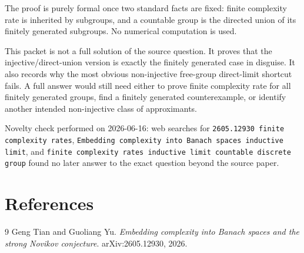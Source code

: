 \documentclass[11pt]{article}
\begin{document}
The proof is purely formal once two standard facts are fixed: finite complexity rate is inherited by subgroups, and a countable group is the directed union of its finitely generated subgroups. No numerical computation is used.

This packet is not a full solution of the source question. It proves that the injective/direct-union version is exactly the finitely generated case in disguise. It also records why the most obvious non-injective free-group direct-limit shortcut fails. A full answer would still need either to prove finite complexity rate for all finitely generated groups, find a finitely generated counterexample, or identify another intended non-injective class of approximants.

Novelty check performed on 2026-06-16: web searches for \texttt{2605.12930 finite complexity rates}, \texttt{Embedding complexity into Banach spaces inductive limit}, and \texttt{finite complexity rates inductive limit countable discrete group} found no later answer to the exact question beyond the source paper.

\section*{References}

\begin{thebibliography}{9}
Geng Tian and Guoliang Yu.
\newblock \emph{Embedding complexity into Banach spaces and the strong Novikov conjecture}.
\newblock arXiv:2605.12930, 2026.
\end{thebibliography}
\end{document}
